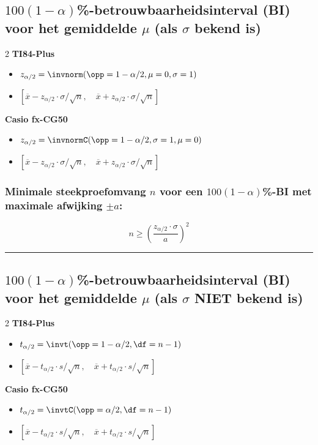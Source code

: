 \subsection*{$100(1-\alpha)$\si{\percent}-betrouwbaarheidsinterval (BI) voor het gemiddelde $\mu$ (als $\sigma$ bekend is)}
    \begin{multicols}{2}
        \centering\textbf{TI84-Plus}
            \begin{itemize}
                \item $z_{\alpha/2} = \invnorm(\opp=1-\alpha/2, \mu=0, \sigma=1)$
                \item $[\overline{x} - z_{\alpha/2} \cdot \sigma / \sqrt{n}, \quad  \overline{x} + z_{\alpha/2} \cdot \sigma / \sqrt{n}]$
            \end{itemize}

            \columnbreak

            \centering\textbf{Casio fx-CG50}
            \begin{itemize}
                \item $z_{\alpha/2} = \invnormC(\opp=1-\alpha/2, \sigma=1, \mu=0)$
                \item $[\overline{x} - z_{\alpha/2} \cdot \sigma / \sqrt{n}, \quad  \overline{x} + z_{\alpha/2} \cdot \sigma / \sqrt{n}]$
            \end{itemize}
    \end{multicols}

    \subsubsection*{Minimale steekproefomvang $n$ voor een $100(1-\alpha)$\si{\percent}-BI met maximale afwijking $\pm a$:}
        \[
            n \ge \left( \frac{z_{\alpha/2} \cdot \sigma}{a} \right)^2
        \]
\hrule 
\subsection*{$100(1-\alpha)$\si{\percent}-betrouwbaarheidsinterval (BI) voor het gemiddelde $\mu$ (als $\sigma$ NIET bekend is)}
    \begin{multicols}{2}
        \centering\textbf{TI84-Plus}
            \begin{itemize}
                \item $t_{\alpha/2} = \invt(\opp=1-\alpha/2, \df=n-1)$
                \item $[\overline{x} - t_{\alpha/2} \cdot s / \sqrt{n}, \quad  \overline{x} + t_{\alpha/2} \cdot s / \sqrt{n}]$
            \end{itemize}

            \columnbreak

            \centering\textbf{Casio fx-CG50}
            \begin{itemize}
                \item $t_{\alpha/2} = \invtC(\opp=\alpha/2, \df=n-1)$
                \item $[\overline{x} - t_{\alpha/2} \cdot s / \sqrt{n}, \quad  \overline{x} + t_{\alpha/2} \cdot s / \sqrt{n}]$
            \end{itemize}
    \end{multicols}
